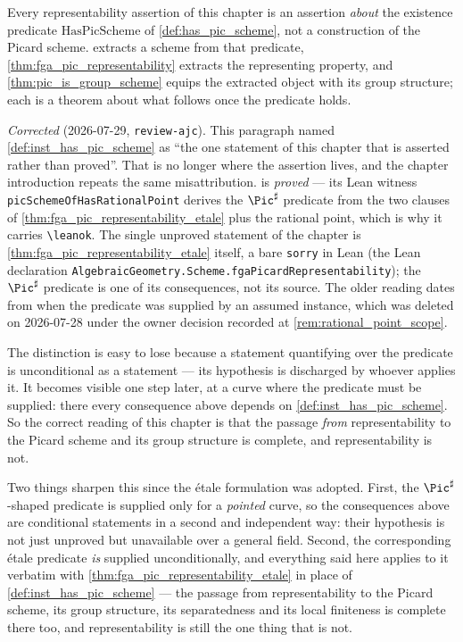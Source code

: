 \begin{remark}
  \label{rem:representability_is_conditional}
  Every representability assertion of this chapter is an assertion \emph{about} the
  existence predicate \(\mathrm{HasPicScheme}\) of \cref{def:has_pic_scheme}, not a
  construction of the Picard scheme.  extracts a scheme from that
  predicate, \cref{thm:fga_pic_representability} extracts the representing property, and
  \cref{thm:pic_is_group_scheme} equips the extracted object with its group structure; each
  is a theorem about what follows once the predicate holds.

  \emph{Corrected} (2026-07-29, \texttt{review-ajc}). This paragraph named
  \cref{def:inst_has_pic_scheme} as ``the one statement of this chapter that is asserted
  rather than proved''. That is no longer where the assertion lives, and the chapter
  introduction repeats the same misattribution.  is
  \emph{proved} --- its Lean witness \texttt{picSchemeOfHasRationalPoint} derives the
  \(\Pic^\sharp\) predicate from the two clauses of
  \cref{thm:fga_pic_representability_etale} plus the rational point, which is why it
  carries \texttt{\textbackslash leanok}. The single unproved statement of the chapter is
  \cref{thm:fga_pic_representability_etale} itself, a bare \texttt{sorry} in Lean
  (the Lean declaration \texttt{AlgebraicGeometry.Scheme.fgaPicardRepresentability});
  the \(\Pic^\sharp\) predicate is one of
  its consequences, not its source. The older reading dates from when the predicate was
  supplied by an assumed instance, which was deleted on 2026-07-28 under the owner decision
  recorded at \cref{rem:rational_point_scope}.

  The distinction is easy to lose because a statement quantifying over the predicate is
  unconditional as a statement --- its hypothesis is discharged by whoever applies it. It
  becomes visible one step later, at a curve where the predicate must be supplied: there
  every consequence above depends on \cref{def:inst_has_pic_scheme}. So the correct reading
  of this chapter is that the passage \emph{from} representability to the Picard scheme and
  its group structure is complete, and representability is not.

  Two things sharpen this since the \'etale formulation was adopted. First, the
  \(\Pic^\sharp\)-shaped predicate is supplied only for a \emph{pointed} curve, so the
  consequences above are conditional statements in a second and independent way: their
  hypothesis is not just unproved but unavailable over a general field. Second, the
  corresponding \'etale predicate \emph{is} supplied unconditionally, and everything said
  here applies to it verbatim with
  \cref{thm:fga_pic_representability_etale} in place of
  \cref{def:inst_has_pic_scheme} --- the passage from representability to the Picard
  scheme, its group structure, its separatedness and its local finiteness is complete
  there too, and representability is still the one thing that is not.
\end{remark}

